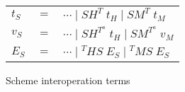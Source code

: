 \begin{figure}
\begin{center}
\begin{tabular}{lcl}
$t_{S}$ & $=$ & $\cdots\;\vert\;SH^{T}\;t_{H}\;\vert\;SM^{T}\;t_{M}$ \\
$v_{S}$ & $=$ & $\cdots\;\vert\;SH^{T^{a}}\;t_{H}\;\vert\;SM^{T^{a}}\;v_{M}$ \\
$E_{S}$ & $=$ & $\cdots\;\vert\;^{T}HS\;E_{S}\;\vert\;^{T}MS\;E_{S}$
\end{tabular}
\end{center}
\caption{Scheme interoperation terms}
\label{fig:sit}
\end{figure}